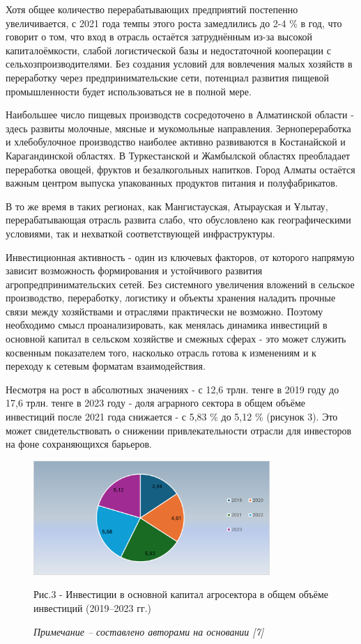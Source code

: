 \begin{multicols}{2}
Хотя общее количество перерабатывающих предприятий постепенно
увеличивается, с 2021 года темпы этого роста замедлились до 2-4 \% в
год, что говорит о том, что вход в отрасль остаётся затруднённым из-за
высокой капиталоёмкости, слабой логистической базы и недостаточной
кооперации с сельхозпроизводителями. Без создания условий для вовлечения
малых хозяйств в переработку через предпринимательские сети, потенциал
развития пищевой промышленности будет использоваться не в полной мере.

Наибольшее число пищевых производств сосредоточено в Алматинской области
- здесь развиты молочные, мясные и мукомольные направления.
Зернопереработка и хлебобулочное производство наиболее активно
развиваются в Костанайской и Карагандинской областях. В Туркестанской и
Жамбылской областях преобладает переработка овощей, фруктов и
безалкогольных напитков. Город Алматы остаётся важным центром выпуска
упакованных продуктов питания и полуфабрикатов.

В то же время в таких регионах, как Мангистауская, Атырауская и Ұлытау,
перерабатывающая отрасль развита слабо, что обусловлено как
географическими условиями, так и нехваткой соответствующей
инфраструктуры.

Инвестиционная активность - один из ключевых факторов, от которого
напрямую зависит возможность формирования и устойчивого развития
агропредпринимательских сетей. Без системного увеличения вложений в
сельское производство, переработку, логистику и объекты хранения
наладить прочные связи между хозяйствами и отраслями практически не
возможно. Поэтому необходимо смысл проанализировать, как менялась
динамика инвестиций в основной капитал в сельском хозяйстве и смежных
сферах - это может служить косвенным показателем того, насколько отрасль
готова к изменениям и к переходу к сетевым форматам взаимодействия.

Несмотря на рост в абсолютных значениях - с 12,6 трлн. тенге в 2019 году
до 17,6 трлн. тенге в 2023 году - доля аграрного сектора в общем объёме
инвестиций после 2021 года снижается - с 5,83 \% до 5,12 \% (рисунок 3).
Это может свидетельствовать о снижении привлекательности отрасли для
инвесторов на фоне сохраняющихся барьеров.
\end{multicols}

\begin{figure}[H]
	\centering
	\includegraphics[width=0.8\textwidth]{media/ekon4/image5}
	\caption*{Рис.3 - Инвестиции в основной капитал агросектора в общем объёме инвестиций (2019--2023 гг.)}
	\caption*{\normalfont\emph{Примечание -- составлено авторами на основании {[}7{]}}}
\end{figure}

